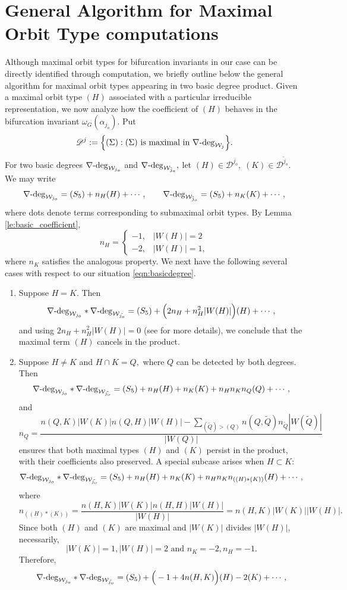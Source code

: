 \documentclass{amsart}%
\begin{document}
\section{General Algorithm for Maximal Orbit Type computations}\label{sec:E}
Although maximal orbit types for bifurcation invariants in our case can be directly identified through computation, we briefly outline below the general algorithm for maximal orbit types appearing in two basic degree product. Given a maximal orbit type $(H)$ associated with a particular irreducible representation, we now analyze how the coefficient of $(H)$ behaves in the bifurcation invariant $\omega_G(\alpha_{j_o}).$\vskip0.3cm
\noindent Put 
\[
\mathscr D^j:=\Big\{(\Sigma):(\Sigma) \text{ is maximal in } \nabla
\text{\textrm{-deg}}_{\mathcal{W}_{j}}\Big\}.
\]
For two basic degrees $\nabla
\text{\textrm{-deg}}_{\mathcal{W}_{j_o}}$ and $\nabla
\text{\textrm{-deg}}_{\mathcal{W}_{\tilde{j}_o}},$ let $(H)\in \mathscr D^{j_o},\; (K) \in \mathscr D^{\tilde{j}_o}.$ We may write
\[
\nabla
\text{\textrm{-deg}}_{\mathcal{W}_{j_o}}=(S_5)+n_H(H)+\cdots,\qquad \nabla
\text{\textrm{-deg}}_{\mathcal{W}_{\tilde{j}_o}}=(S_5)+n_K(K)+\cdots,
\]
where dots denote terms corresponding to submaximal orbit types. By Lemma \eqref{le:basic_coefficient},
\[
n_H=\begin{cases}
    -1,\;\;\; |W(H)|=2\\
    -2,\;\;\; |W(H)|=1,
\end{cases}
\]
where $n_K$ satisfies the analogous property. We next have the following several cases with respect to our situation \eqref{eqn:basicdegree}.
\begin{enumerate}
\item[(i)]Suppose $H=K.$ Then 
\[
\nabla
\text{\textrm{-deg}}_{\mathcal{W}_{j_o}}*\nabla
\text{\textrm{-deg}}_{\mathcal{W}_{\tilde{j_o}}}=(S_5)+\Big(2n_H+n_H^2|W(H)|\Big)(H)+\cdots,
\]
and using $2n_H+n_H^2|W(H)|=0$ (see \cite{liu2025nonlinear} for more details), we conclude that the maximal term $(H)$ cancels in the product.
\item[(ii)] Suppose $H\neq K$ and $H\cap K=Q,$ where $Q$ can be detected by both degrees. Then 
\[
\nabla
\text{\textrm{-deg}}_{\mathcal{W}_{j_o}}*\nabla
\text{\textrm{-deg}}_{\mathcal{W}_{\tilde{j_o}}}=(S_5)+n_H(H)+n_K(K)+n_Hn_Kn_Q(Q)+\cdots,
\]
and
\[
n_Q=\frac{n(Q,K)|W(K)|n(Q,H)|W(H)|-\sum_{(\widetilde{Q})>(Q)}n(Q,\widetilde
{Q})n_{\widetilde{Q}}|W(\widetilde{Q})|}{|W(Q)|} 
\]
ensures that both maximal types $(H)$ and $(K)$ persist in the product, with their coefficients also preserved. A special subcase arises when $H\subset K:$  
\[
\nabla
\text{\textrm{-deg}}_{\mathcal{W}_{j_o}}*\nabla
\text{\textrm{-deg}}_{\mathcal{W}_{\tilde{j_o}}}=(S_5)+n_H(H)+n_K(K)+n_Hn_Kn_{((H)*(K))}(H)+\cdots,
\]
where
\[
n_{((H)*(K))}=\frac{n(H,K)|W(K)|n(H,H)|W(H)|}{|W(H)|}=n(H,K)|W(K)||W(H)|.
\]
Since both $(H)$ and $(K)$ are maximal and $|W(K)|$ divides $|W(H)|,$ necessarily, 
\[
|W(K)|=1,|W(H)|=2 \text{  and  } n_K=-2, n_H=-1.
\]
Therefore,
\[
\nabla
\text{\textrm{-deg}}_{\mathcal{W}_{j_o}}*\nabla
\text{\textrm{-deg}}_{\mathcal{W}_{\tilde{j_o}}}=(S_5)+\Big(-1+4n(H,K)\Big)(H)-2(K)+\cdots,
\]
\end{enumerate}


\newpage



\end{document}
